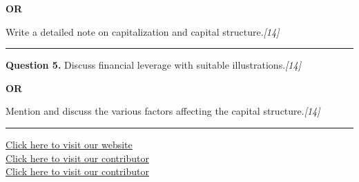 \documentclass[11pt,a4paper]{article}
\newcommand{\pts}[1]{\hfill   \textit{[#1]}}
\begin{document}
\centerline{   \textbf{OR}}

Write a detailed note on capitalization and capital structure.\pts{14}

\medskip\rule{\linewidth}{0.2pt}




\noindent   \textbf{Question 5.}
Discuss financial leverage with suitable illustrations.\pts{14}

\centerline{   \textbf{OR}}

Mention and discuss the various factors affecting the capital structure.\pts{14}

\vfill
\rule{\linewidth}{0.4pt}

\begin{center}\small
\href{https://bhu-exam.vercel.app/}{Click here to visit our website}\\[4pt]
\href{https://me-aryan.vercel.app/}{Click here to visit our contributor}\\[4pt]
\href{https://quashan-me.vercel.app/}{Click here to visit our contributor}
\end{center}
\end{document}
